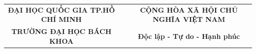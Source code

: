 \thispagestyle{empty}

\fontsize{12pt}{14.4pt}\selectfont

\noindent
\begin{table}[!ht]
\centering
    \resizebox{\textwidth}{!}
    {
        \begin{tabular}{ccc}
        \textbf{ĐẠI HỌC QUỐC GIA TP.HỒ CHÍ MINH} & & \textbf{CỘNG HÒA XÃ HỘI CHỦ NGHĨA VIỆT NAM} \\
        \textbf{TRƯỜNG ĐẠI HỌC BÁCH KHOA}         & & \textbf{Độc lập - Tự do - Hạnh phúc}
        \end{tabular}
    }
\end{table}

\begingroup
\renewcommand{\arraystretch}{1}

\newlength{\spanallbutone}
\setlength{\spanallbutone}{\dimexpr\textwidth-0.6cm-4\tabcolsep-3\arrayrulewidth\relax}

\newlength{\insttask}
\setlength{\insttask}{\dimexpr\textwidth-0.6cm-1.4cm-5.0cm-8\tabcolsep-5\arrayrulewidth\relax}

